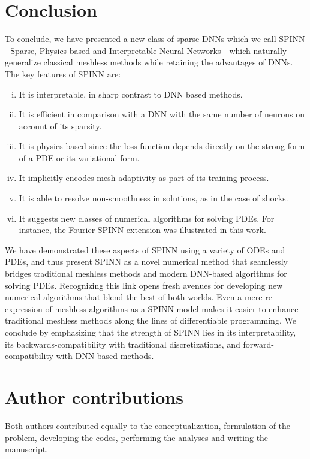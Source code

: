 \documentclass[12pt]{article}
\newcommand{\new}[1]{#1}
\begin{document}
\section{Conclusion}
To conclude, we have presented a new class of sparse DNNs which we call SPINN - Sparse, Physics-based and Interpretable Neural Networks - which naturally generalize classical meshless methods while retaining the advantages of DNNs. The key features  of SPINN are:
\begin{enumerate}[(i)]
\item It is interpretable, in sharp contrast to DNN based methods.
\item It is efficient in comparison with a DNN with the same number of neurons on account of its sparsity.
\item It is physics-based since the loss function depends directly on the strong form of a PDE or its variational form.
\item It implicitly encodes mesh adaptivity as part of its training process.
\item It is able to resolve non-smoothness in solutions, as in the case of shocks.
\item It suggests new classes of numerical algorithms for solving PDEs. For instance, the Fourier-SPINN extension was illustrated in this work.
\end{enumerate}
We have demonstrated these aspects of SPINN using a variety of ODEs and PDEs, and thus present SPINN as a novel numerical method that seamlessly bridges traditional meshless methods and modern DNN-based algorithms for solving PDEs.  Recognizing this link opens fresh avenues for developing new numerical algorithms that blend the best of both worlds. Even a mere re-expression of meshless algorithms as a SPINN model makes it easier to enhance traditional meshless methods along the lines of differentiable programming. \new{We conclude by emphasizing that the strength of SPINN lies in its interpretability, its backwards-compatibility with traditional discretizations, and forward-compatibility with DNN based methods.}


\section*{Author contributions}
Both authors contributed equally to the conceptualization, formulation of the problem, developing the codes, performing the analyses and writing the manuscript.



\end{document}
